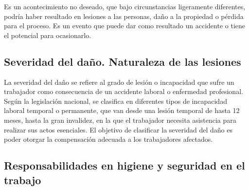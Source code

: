 Es un acontecimiento no deseado, que bajo circunstancias ligeramente
diferentes, podría haber resultado en lesiones a las personas, daño a la
propiedad o pérdida para el proceso. Es un evento que puede dar como resultado
un accidente o tiene el potencial para ocasionarlo.

\subsection{Severidad del daño. Naturaleza de las lesiones}

La severidad del daño se refiere al grado de lesión o incapacidad que sufre un
trabajador como consecuencia de un accidente laboral o enfermedad profesional.
Según la legislación nacional, se clasifica en diferentes tipos de incapacidad
laboral temporal o permanente, que van desde una lesión temporal de hasta 12
meses, hasta la gran invalidez, en la que el trabajador necesita asistencia
para realizar sus actos esenciales. El objetivo de clasificar la severidad del
daño es poder otorgar la compensación adecuada a los trabajadores afectados.

\subsection{Responsabilidades en higiene y seguridad en el trabajo}

